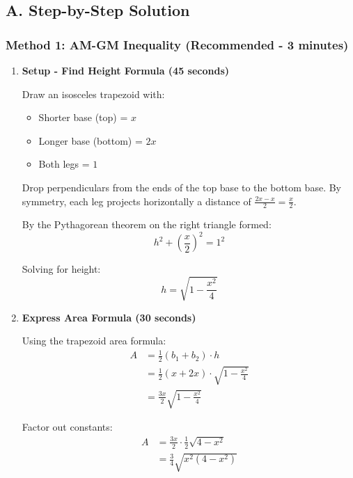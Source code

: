 \documentclass[12pt]{article}
\begin{document}
\begin{solutionbox}
\subsection*{A. Step-by-Step Solution}

\subsubsection*{Method 1: AM-GM Inequality (Recommended - 3 minutes)}

\begin{enumerate}[leftmargin=*]
    \item \textbf{Setup - Find Height Formula (45 seconds)}
    
    Draw an isosceles trapezoid with:
    \begin{itemize}
        \item Shorter base (top) = $x$
        \item Longer base (bottom) = $2x$
        \item Both legs = $1$
    \end{itemize}
    
    Drop perpendiculars from the ends of the top base to the bottom base. By symmetry, each leg projects horizontally a distance of $\frac{2x - x}{2} = \frac{x}{2}$.
    
    By the Pythagorean theorem on the right triangle formed:
    \begin{equation}
        h^2 + \left(\frac{x}{2}\right)^2 = 1^2
    \end{equation}
    
    Solving for height:
    \begin{equation}
        h = \sqrt{1 - \frac{x^2}{4}}
    \end{equation}
    
    \item \textbf{Express Area Formula (30 seconds)}
    
    Using the trapezoid area formula:
    \begin{align*}
        A &= \frac{1}{2}(b_1 + b_2) \cdot h \\
        &= \frac{1}{2}(x + 2x) \cdot \sqrt{1 - \frac{x^2}{4}} \\
        &= \frac{3x}{2} \sqrt{1 - \frac{x^2}{4}}
    \end{align*}
    
    Factor out constants:
    \begin{align*}
        A &= \frac{3x}{2} \cdot \frac{1}{2}\sqrt{4 - x^2} \\
        &= \frac{3}{4} \sqrt{x^2(4 - x^2)}
    \end{align*}
    

\end{enumerate}
\end{solutionbox}
\end{document}

